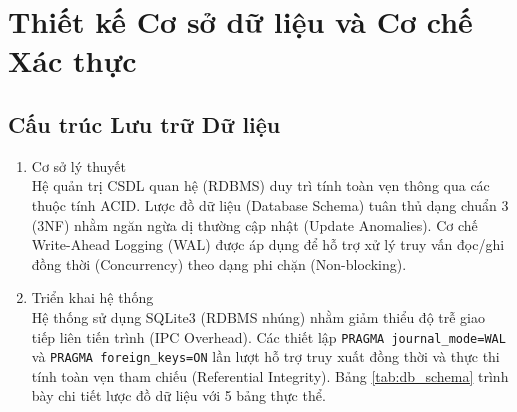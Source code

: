 \section{Thiết kế Cơ sở dữ liệu và Cơ chế Xác thực}

\subsection{Cấu trúc Lưu trữ Dữ liệu}

\begin{enumerate}
    \item Cơ sở lý thuyết \\
    Hệ quản trị CSDL quan hệ (RDBMS) duy trì tính toàn vẹn thông qua các thuộc tính ACID. Lược đồ dữ liệu (Database Schema) tuân thủ dạng chuẩn 3 (3NF) nhằm ngăn ngừa dị thường cập nhật (Update Anomalies). Cơ chế Write-Ahead Logging (WAL) được áp dụng để hỗ trợ xử lý truy vấn đọc/ghi đồng thời (Concurrency) theo dạng phi chặn (Non-blocking).

    \item Triển khai hệ thống \\
    Hệ thống sử dụng SQLite3 (RDBMS nhúng) nhằm giảm thiểu độ trễ giao tiếp liên tiến trình (IPC Overhead). Các thiết lập \texttt{PRAGMA journal\_mode=WAL} và \texttt{PRAGMA foreign\_keys=ON} lần lượt hỗ trợ truy xuất đồng thời và thực thi tính toàn vẹn tham chiếu (Referential Integrity). Bảng \ref{tab:db_schema} trình bày chi tiết lược đồ dữ liệu với 5 bảng thực thể.
\end{enumerate}

